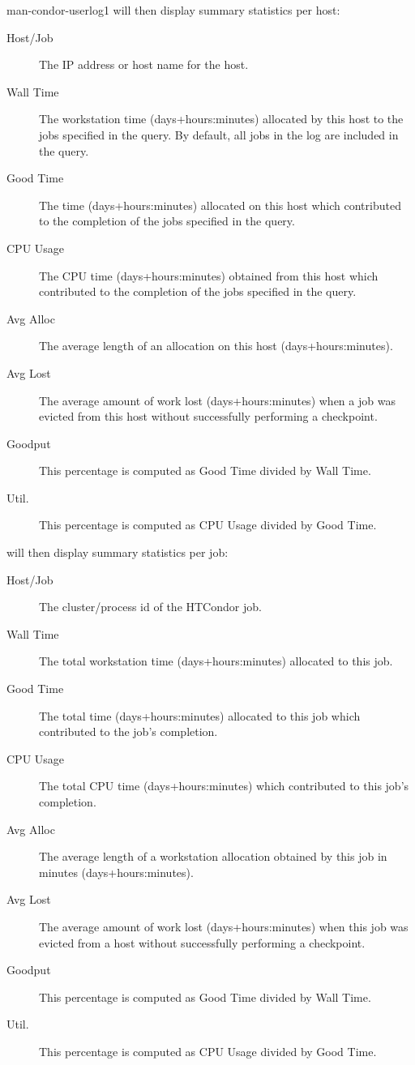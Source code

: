 \begin{ManPage}{}{man-condor-userlog}{1}
 will then display summary statistics per host:

\begin{description}
\item[Host/Job] The IP address or host name for the host.
\item[Wall Time] The workstation time (days+hours:minutes) allocated by
this host to the jobs specified in the query.  By default, all jobs in
the log are included in the query.
\item[Good Time] The time (days+hours:minutes) allocated on this host which
contributed to the completion of the jobs specified in the query.
\item[CPU Usage] The CPU time (days+hours:minutes) obtained from this
host which
contributed to the completion of the jobs specified in the query.
\item[Avg Alloc] The average length of an allocation on this host
(days+hours:minutes).
\item[Avg Lost] The average amount of work lost (days+hours:minutes) when a job
was evicted from this host without successfully performing a checkpoint.
\item[Goodput] This percentage is computed as Good Time divided by
Wall Time.
\item[Util.] This percentage is computed as CPU Usage divided by Good
Time.
\end{description}

 will then display summary statistics per job:

\begin{description}
\item[Host/Job] The cluster/process id of the HTCondor job.
\item[Wall Time] The total workstation time (days+hours:minutes) allocated to
this job.
\item[Good Time] The total time (days+hours:minutes) allocated to this
job which 
contributed to the job's completion.
\item[CPU Usage] The total CPU time (days+hours:minutes) which
contributed to this 
job's completion.
\item[Avg Alloc] The average length of a workstation allocation
obtained by this job in minutes (days+hours:minutes).
\item[Avg Lost] The average amount of work lost (days+hours:minutes)
when this job 
was evicted from a host without successfully performing a checkpoint.
\item[Goodput] This percentage is computed as Good Time divided by
Wall Time.
\item[Util.] This percentage is computed as CPU Usage divided by Good
Time.
\end{description}


\end{ManPage}
